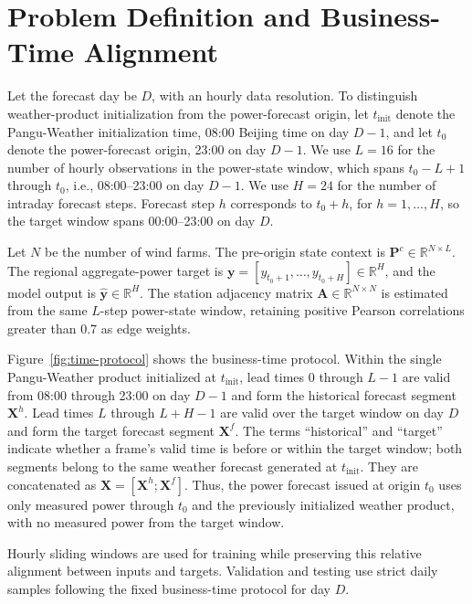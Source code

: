 \section{Problem Definition and Business-Time Alignment}

Let the forecast day be \(D\), with an hourly data resolution. To distinguish weather-product initialization from the power-forecast origin, let \(t_{\mathrm{init}}\) denote the Pangu-Weather initialization time, 08:00 Beijing time on day \(D-1\), and let \(t_0\) denote the power-forecast origin, 23:00 on day \(D-1\). We use \(L=16\) for the number of hourly observations in the power-state window, which spans \(t_0-L+1\) through \(t_0\), i.e., 08:00--23:00 on day \(D-1\). We use \(H=24\) for the number of intraday forecast steps. Forecast step \(h\) corresponds to \(t_0+h\), for \(h=1,\ldots,H\), so the target window spans 00:00--23:00 on day \(D\).

Let \(N\) be the number of wind farms. The pre-origin state context is \(\mathbf{P}^{c}\in\mathbb{R}^{N\times L}\). The regional aggregate-power target is \(\mathbf{y}=[y_{t_0+1},\ldots,y_{t_0+H}]\in\mathbb{R}^{H}\), and the model output is \(\hat{\mathbf{y}}\in\mathbb{R}^{H}\). The station adjacency matrix \(\mathbf{A}\in\mathbb{R}^{N\times N}\) is estimated from the same \(L\)-step power-state window, retaining positive Pearson correlations greater than 0.7 as edge weights.

Figure~\ref{fig:time-protocol} shows the business-time protocol. Within the single Pangu-Weather product initialized at \(t_{\mathrm{init}}\), lead times 0 through \(L-1\) are valid from 08:00 through 23:00 on day \(D-1\) and form the historical forecast segment \(\mathbf{X}^{h}\). Lead times \(L\) through \(L+H-1\) are valid over the target window on day \(D\) and form the target forecast segment \(\mathbf{X}^{f}\). The terms ``historical'' and ``target'' indicate whether a frame's valid time is before or within the target window; both segments belong to the same weather forecast generated at \(t_{\mathrm{init}}\). They are concatenated as \(\mathbf{X}=[\mathbf{X}^{h};\mathbf{X}^{f}]\). Thus, the power forecast issued at origin \(t_0\) uses only measured power through \(t_0\) and the previously initialized weather product, with no measured power from the target window.

Hourly sliding windows are used for training while preserving this relative alignment between inputs and targets. Validation and testing use strict daily samples following the fixed business-time protocol for day \(D\).
